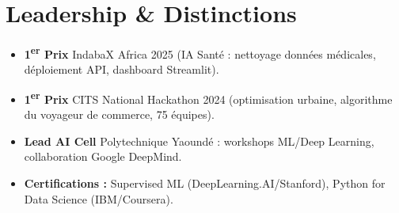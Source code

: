 \documentclass[a4paper,11pt]{article}
\begin{document}
\section{Leadership \& Distinctions}
\begin{itemize}[leftmargin=*, label=\tiny$\bullet$, nosep]
    \item \small{\textbf{1\textsuperscript{er} Prix} IndabaX Africa 2025 (IA Santé : nettoyage données médicales, déploiement API, dashboard Streamlit).}
    \item \small{\textbf{1\textsuperscript{er} Prix} CITS National Hackathon 2024 (optimisation urbaine, algorithme du voyageur de commerce, 75 équipes).}
    \item \small{\textbf{Lead AI Cell} Polytechnique Yaoundé : workshops ML/Deep Learning, collaboration Google DeepMind.}
    \item \small{\textbf{Certifications :} Supervised ML (DeepLearning.AI/Stanford), Python for Data Science (IBM/Coursera).}
\end{itemize}
\end{document}
